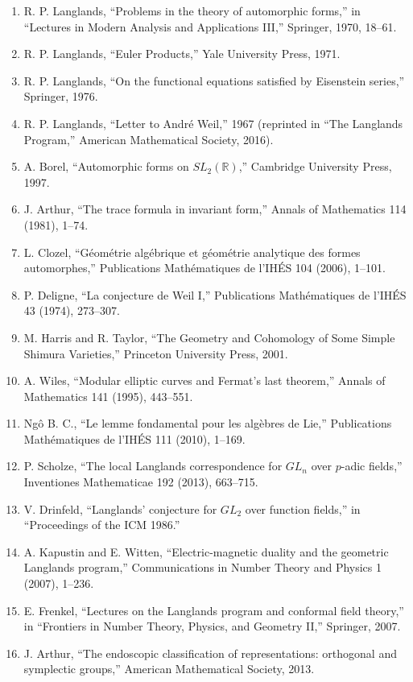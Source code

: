 \begin{enumerate}
\item R. P. Langlands, ``Problems in the theory of automorphic forms,'' in ``Lectures in Modern Analysis and Applications III,'' Springer, 1970, 18--61.
\item R. P. Langlands, ``Euler Products,'' Yale University Press, 1971.
\item R. P. Langlands, ``On the functional equations satisfied by Eisenstein series,'' Springer, 1976.
\item R. P. Langlands, ``Letter to Andr\'e Weil,'' 1967 (reprinted in ``The Langlands Program,'' American Mathematical Society, 2016).
\item A. Borel, ``Automorphic forms on $SL_2(\mathbb{R})$,'' Cambridge University Press, 1997.
\item J. Arthur, ``The trace formula in invariant form,'' Annals of Mathematics 114 (1981), 1--74.
\item L. Clozel, ``G\'eom\'etrie alg\'ebrique et g\'eom\'etrie analytique des formes automorphes,'' Publications Math\'ematiques de l'IH\'ES 104 (2006), 1--101.
\item P. Deligne, ``La conjecture de Weil I,'' Publications Math\'ematiques de l'IH\'ES 43 (1974), 273--307.
\item M. Harris and R. Taylor, ``The Geometry and Cohomology of Some Simple Shimura Varieties,'' Princeton University Press, 2001.
\item A. Wiles, ``Modular elliptic curves and Fermat's last theorem,'' Annals of Mathematics 141 (1995), 443--551.
\item Ng\^o B. C., ``Le lemme fondamental pour les alg\`ebres de Lie,'' Publications Math\'ematiques de l'IH\'ES 111 (2010), 1--169.
\item P. Scholze, ``The local Langlands correspondence for $GL_n$ over $p$-adic fields,'' Inventiones Mathematicae 192 (2013), 663--715.
\item V. Drinfeld, ``Langlands' conjecture for $GL_2$ over function fields,'' in ``Proceedings of the ICM 1986.''
\item A. Kapustin and E. Witten, ``Electric-magnetic duality and the geometric Langlands program,'' Communications in Number Theory and Physics 1 (2007), 1--236.
\item E. Frenkel, ``Lectures on the Langlands program and conformal field theory,'' in ``Frontiers in Number Theory, Physics, and Geometry II,'' Springer, 2007.
\item J. Arthur, ``The endoscopic classification of representations: orthogonal and symplectic groups,'' American Mathematical Society, 2013.

\end{enumerate}
